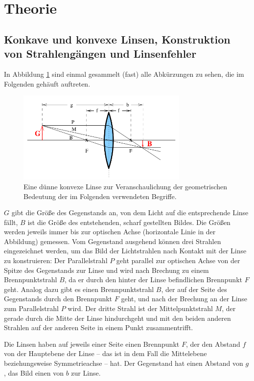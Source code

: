 \section{Theorie}
\label{sec:Theorie}

\subsection{Konkave und konvexe Linsen, Konstruktion von Strahlengängen und Linsenfehler}

In Abbildung \ref{fig:konvex_duenn} sind einmal gesammelt (fast) alle Abkürzungen zu sehen, die im Folgenden gehäuft auftreten. 
\begin{figure}
    \centering
    \includegraphics[width=0.75\textwidth]{plots/Linse1.png}
    \caption{Eine dünne konvexe Linse zur Veranschaulichung der geometrischen Bedeutung der im Folgenden verwendeten Begriffe\cite{Versuchsanleitung}.}
    \label{fig:konvex_duenn}
\end{figure}
$G$ gibt die Größe des Gegenstands an, von dem Licht auf die entsprechende Linse fällt, $B$ ist die Größe des entstehenden, 
scharf gestellten Bildes. Die Größen werden jeweils immer bis zur optischen Achse (horizontale Linie in der Abbildung) gemessen. 
Vom Gegenstand ausgehend können drei Strahlen eingezeichnet werden, um das Bild der Lichtstrahlen nach Kontakt mit der Linse 
zu konstruieren: Der Parallelstrahl $P$ geht parallel zur optischen Achse von der Spitze des Gegenstands zur Linse und wird nach Brechung zu einem 
Brennpunktstrahl $B$, da er durch den hinter der Linse befindlichen Brennpunkt $F$ geht. 
Analog dazu gibt es einen Brennpunktstrahl $B$, der auf der Seite des Gegenstands durch den Brennpunkt $F$ geht, und nach der 
Brechung an der Linse zum Parallelstrahl $P$ wird. 
Der dritte Strahl ist der Mittelpunktstrahl $M$, der gerade durch die Mitte der Linse hindurchgeht und mit den beiden anderen 
Strahlen auf der anderen Seite in einem Punkt zusammentrifft. 

Die Linsen haben auf jeweils einer Seite einen Brennpunkt $F$, der den Abstand $f$ von der Hauptebene der Linse -- das
ist in dem Fall die Mittelebene beziehungsweise Symmetrieachse -- hat. 
Der Gegenstand hat einen Abstand von $g$, das Bild einen von $b$ zur Linse. 

